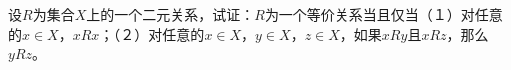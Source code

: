   \begin{Exercise}
设$R$为集合$X$上的一个二元关系，试证：$R$为一个等价关系当且仅当（１）对任意的$x\in X$，$xRx$；（２）对任意的$x\in X$，$y\in X$，$z\in X$，如果$xRy$且$xRz$，那么$yRz$。    
  \end{Exercise}
